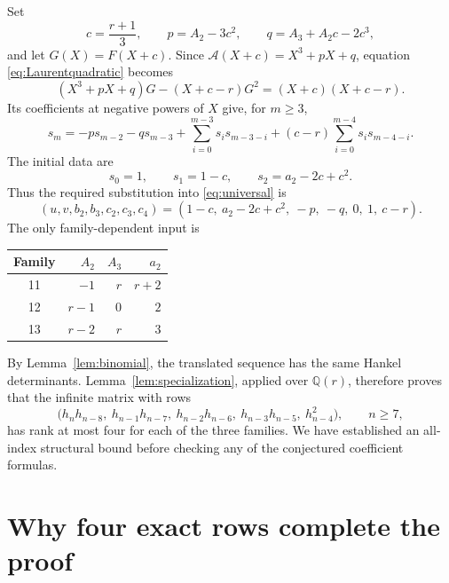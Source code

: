 \documentclass[11pt,letterpaper]{article}
\numberwithin{equation}{section}
\theoremstyle{definition}
\newcommand{\Q}{\mathbb Q}
\begin{document}
Set
\begin{equation}
 c=\frac{r+1}{3},\qquad
 p=A_2-3c^2,\qquad q=A_3+A_2c-2c^3,
 \label{eq:cpq}
\end{equation}
and let \(G(X)=F(X+c)\). Since
\(\mathcal A(X+c)=X^3+pX+q\), equation \eqref{eq:Laurentquadratic} becomes
\begin{equation}
 (X^3+pX+q)G-(X+c-r)G^2=(X+c)(X+c-r).
 \label{eq:translatedquadratic}
\end{equation}
Its coefficients at negative powers of \(X\) give, for \(m\geq3\),
\begin{equation}
 s_m=-ps_{m-2}-qs_{m-3}
       +\sum_{i=0}^{m-3}s_is_{m-3-i}
       +(c-r)\sum_{i=0}^{m-4}s_is_{m-4-i}.
 \label{eq:specialmoment}
\end{equation}
The initial data are
\begin{equation}
 s_0=1,\qquad s_1=1-c,\qquad s_2=a_2-2c+c^2.
 \label{eq:specialinitial}
\end{equation}
Thus the required substitution into \eqref{eq:universal} is
\begin{equation}
 \boxed{\quad
 (u,v,b_2,b_3,c_2,c_3,c_4)
 =(1-c,\ a_2-2c+c^2,\ -p,\ -q,\ 0,\ 1,\ c-r).
 \quad}
 \label{eq:sevenparameters}
\end{equation}
The only family-dependent input is
\begin{center}
\begin{tabular}{c r r r}
\toprule
Family & \(A_2\) & \(A_3\) & \(a_2\)\\
\midrule
11 & \(-1\) & \(r\) & \(r+2\)\\
12 & \(r-1\) & \(0\) & \(2\)\\
13 & \(r-2\) & \(r\) & \(3\)\\
\bottomrule
\end{tabular}
\end{center}

By Lemma~\ref{lem:binomial}, the translated sequence has the same Hankel
determinants. Lemma~\ref{lem:specialization}, applied over \(\Q(r)\),
therefore proves that the infinite matrix with rows
\begin{equation}
 \bigl(h_nh_{n-8},\ h_{n-1}h_{n-7},\ h_{n-2}h_{n-6},\
 h_{n-3}h_{n-5},\ h_{n-4}^2\bigr),\qquad n\geq7,
 \label{eq:familymatrix}
\end{equation}
has rank at most four for each of the three families. We have established
an all-index structural bound before checking any of the conjectured
coefficient formulas.

\section{Why four exact rows complete the proof}
\label{sec:finite}
\end{document}
